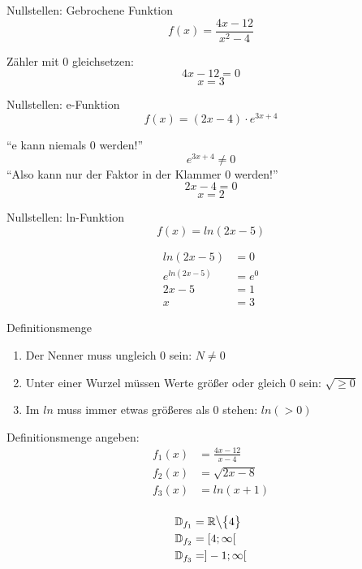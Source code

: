 \documentclass[paper=a6,landscape,ngerman,twoside=true,fontsize=12pt]{scrartcl}
\begin{document}
\begin{frage}
	Nullstellen: Gebrochene Funktion
	\[
	f(x)=\frac{4x-12}{x^2-4}
	\]
\end{frage}
\begin{antwort}
	Zähler mit 0 gleichsetzen:
	\[
	4x-12=0
	\]
	\[
	x=3
	\]
\end{antwort}
\begin{frage}
	Nullstellen: e-Funktion
	\[
	f(x)=(2x-4)\cdot{e^{3x+4}}
	\]
\end{frage}
\begin{antwort}
	"`e kann niemals 0 werden!"'
	\[
	{e^{3x+4}}\neq0
	\]
	"`Also kann nur der Faktor in der Klammer 0 werden!"'
	\[
	2x-4=0
	\]
	\[
	x=2
	\]
\end{antwort}
\begin{frage}
	Nullstellen: ln-Funktion
	\[
	f(x)=ln(2x-5)
	\]
\end{frage}
\begin{antwort}
	\begin{align*}
		ln(2x-5)&=0\\
		{e^{ln(2x-5)}}&=e^0\\
		2x-5&=1\\
		x&=3
	\end{align*}

\end{antwort}
\begin{frage}
	Definitionsmenge
\end{frage}
\begin{antwort}
	\begin{enumerate}
		\item Der Nenner muss ungleich 0 sein: $N \neq 0$
		\item Unter einer Wurzel müssen Werte größer oder gleich 0 sein: $\sqrt{\ge 0}$
		\item Im $ln$ muss immer etwas größeres als 0 stehen: $ln(>0)$\
	\end{enumerate}
\end{antwort}
\begin{frage}
	Definitionsmenge angeben:
	\begin{align*}
	     f_1(x)&=\frac{4x-12}{x-4} \\
		 f_2(x)&=\sqrt{2x-8}\\
		 f_3(x)&=ln(x+1)\\
	\end{align*}
\end{frage}
\begin{antwort}
	\begin{align*}
	   	  \mathbb{D}_{f_1}&=\mathbb{R}\big\backslash\big\{4\big\} \\
		  \mathbb{D}_{f_2}&=[4;\infty[ \\
		  \mathbb{D}_{f_3}&=]-1;\infty[ \\
	\end{align*}
\end{antwort}
\end{document}
